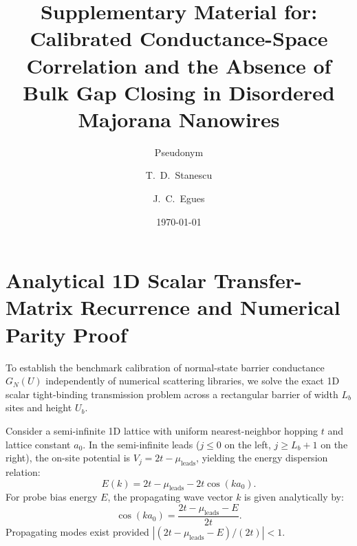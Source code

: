\documentclass[aps,prb,reprint,superscriptaddress,showpacs,amsmath,amssymb]{revtex4-2}
\begin{document}
\title{Supplementary Material for:\\
Calibrated Conductance-Space Correlation and the Absence of Bulk Gap Closing in Disordered Majorana Nanowires}

\author{Pseudonym}

\author{T.~D.~Stanescu}

\author{J.~C.~Egues}

\date{\today}

\maketitle

\section{Analytical 1D Scalar Transfer-Matrix Recurrence and Numerical Parity Proof}
\label{sec:transfer_matrix}

To establish the benchmark calibration of normal-state barrier conductance $G_N(U)$ independently of numerical scattering libraries, we solve the exact 1D scalar tight-binding transmission problem across a rectangular barrier of width $L_b$ sites and height $U_b$.

Consider a semi-infinite 1D lattice with uniform nearest-neighbor hopping $t$ and lattice constant $a_0$. In the semi-infinite leads ($j \le 0$ on the left, $j \ge L_b + 1$ on the right), the on-site potential is $V_j = 2t - \mu_{\mathrm{leads}}$, yielding the energy dispersion relation:
\begin{equation}
E(k) = 2t - \mu_{\mathrm{leads}} - 2t \cos(k a_0).
\label{eq:lead_dispersion}
\end{equation}
For probe bias energy $E$, the propagating wave vector $k$ is given analytically by:
\begin{equation}
\cos(k a_0) = \frac{2t - \mu_{\mathrm{leads}} - E}{2t}.
\label{eq:cos_k}
\end{equation}
Propagating modes exist provided $|(2t - \mu_{\mathrm{leads}} - E) / (2t)| < 1$.
\end{document}
